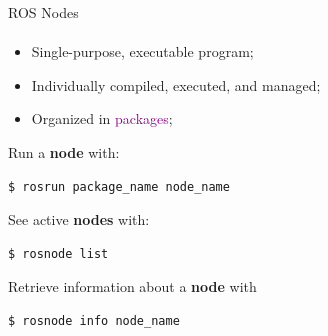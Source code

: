 \documentclass[aspectratio=169]{beamer}
\begin{document}
\begin{frame}[fragile]{ROS Nodes}
	\framesubtitle{ }
	\begin{minipage}{0.6\textwidth}
    \begin{itemize}
        \item Single-purpose, executable program;
        \item Individually compiled, executed, and managed;
        \item Organized in \textcolor{purple}{packages};
    \end{itemize}

	Run a \textbf{node} with:
	\begin{lstlisting}[language=bash]
		$ rosrun package_name node_name
    \end{lstlisting}

	See active \textbf{nodes} with:
	\begin{lstlisting}[language=bash]
		$ rosnode list
    \end{lstlisting}

	Retrieve information about a \textbf{node} with
	\begin{lstlisting}[language=bash]
		$ rosnode info node_name
    \end{lstlisting}


\end{minipage}
\begin{minipage}{0.4\textwidth}
	
\end{minipage}
\end{frame}
\end{document}
